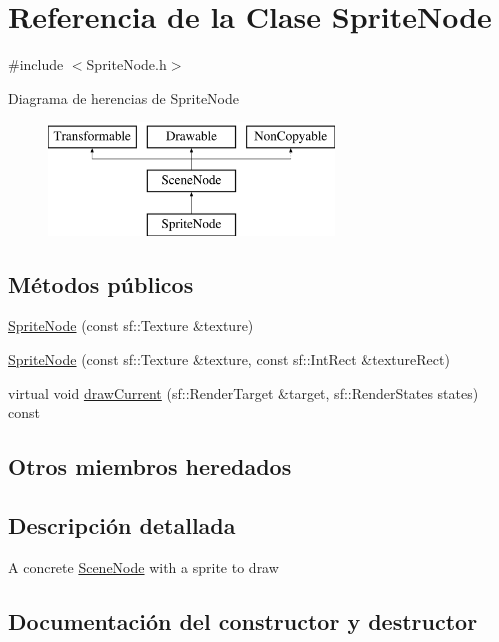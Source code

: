 \hypertarget{classSpriteNode}{}\section{Referencia de la Clase Sprite\+Node}
\label{classSpriteNode}


{\ttfamily \#include $<$Sprite\+Node.\+h$>$}

Diagrama de herencias de Sprite\+Node\begin{figure}[H]
\begin{center}
\leavevmode
\includegraphics[height=3.000000cm]{classSpriteNode}
\end{center}
\end{figure}
\subsection*{Métodos públicos}
\begin{DoxyCompactItemize}
\item 
\hyperlink{classSpriteNode_ad72b769f4c57e5d77a8d6ba223f487b0}{Sprite\+Node} (const sf\+::\+Texture \&texture)
\item 
\hyperlink{classSpriteNode_ac12927969dcfd6f02da372e7e22c2af1}{Sprite\+Node} (const sf\+::\+Texture \&texture, const sf\+::\+Int\+Rect \&texture\+Rect)
\item 
virtual void \hyperlink{classSpriteNode_a30748234dea11083eafb7b22f9567e52}{draw\+Current} (sf\+::\+Render\+Target \&target, sf\+::\+Render\+States states) const 
\end{DoxyCompactItemize}
\subsection*{Otros miembros heredados}


\subsection{Descripción detallada}
A concrete \hyperlink{classSceneNode}{Scene\+Node} with a sprite to draw 

\subsection{Documentación del constructor y destructor}
\hypertarget{classSpriteNode_ad72b769f4c57e5d77a8d6ba223f487b0}{}

